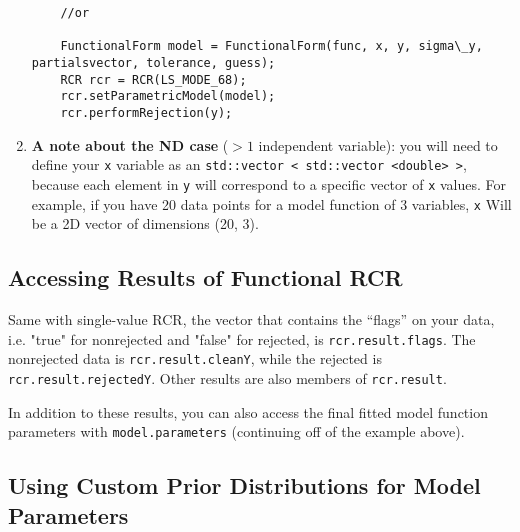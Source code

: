 \documentclass[12pt]{article}
\begin{document}
\begin{enumerate}
\begin{lstlisting}
	//or
	
	FunctionalForm model = FunctionalForm(func, x, y, sigma\_y, partialsvector, tolerance, guess);
	RCR rcr = RCR(LS_MODE_68);
	rcr.setParametricModel(model);
	rcr.performRejection(y);
	\end{lstlisting}
	
	\item \textbf{A note about the ND case} ($>1$ independent variable): you will need to define your \texttt{x} variable as an \texttt{std::vector < std::vector <double> >}, because each element in \texttt{y} will correspond to a specific vector of \texttt{x} values. For example, if you have 20 data points for a model function of 3 variables, \texttt{x} Will be a 2D vector of dimensions (20, 3).
		
\end{enumerate}
\subsection{Accessing Results of Functional RCR}
\par Same with single-value RCR, the vector that contains the ``flags'' on your data, i.e. "true" for nonrejected and "false" for rejected, is \texttt{rcr.result.flags}. The nonrejected data is \texttt{rcr.result.cleanY}, while the rejected is \texttt{rcr.result.rejectedY}. Other results are also members of \texttt{rcr.result}.
\par In addition to these results, you can also access the final fitted model function parameters with \texttt{model.parameters} (continuing off of the example above).
\subsection{Using Custom Prior Distributions for Model Parameters}
\end{document}
